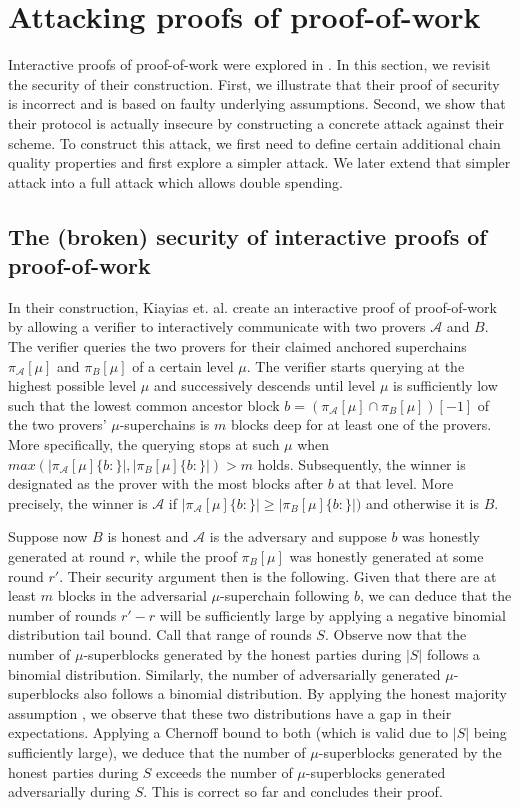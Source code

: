 \section{Attacking proofs of proof-of-work}

Interactive proofs of proof-of-work were explored in \cite{KLS}. In this
section, we revisit the security of their construction. First, we illustrate
that their proof of security is incorrect and is based on faulty underlying
assumptions. Second, we show that their protocol is actually insecure by
constructing a concrete attack against their scheme. To construct this attack,
we first need to define certain additional chain quality properties and first
explore a simpler attack. We later extend that simpler attack into a full attack
which allows double spending.

\subsection{The (broken) security of interactive proofs of proof-of-work}

In their construction, Kiayias et. al. \cite{KLS} create an interactive proof of
proof-of-work by allowing a verifier to interactively communicate with two
provers $\mathcal{A}$ and $B$. The verifier queries the two provers for their
claimed anchored superchains $\pi_\mathcal{A}[\mu]$ and $\pi_B[\mu]$ of a
certain level $\mu$. The verifier starts querying at the highest possible level
$\mu$ and successively descends until level $\mu$ is sufficiently low such that
the lowest common ancestor block $b = (\pi_\mathcal{A}[\mu] \cap
\pi_B[\mu])[-1]$ of the two provers' $\mu$-superchains is $m$ blocks deep for at
least one of the provers. More specifically, the querying stops at such $\mu$
when $max(|\pi_\mathcal{A}[\mu]\{b:\}|, |\pi_B[\mu]\{b:\}|) > m$ holds.
Subsequently, the winner is designated as the prover with the most blocks after
$b$ at that level. More precisely, the winner is $\mathcal{A}$ if
$|\pi_\mathcal{A}[\mu]\{b:\}| \geq |\pi_B[\mu]\{b:\}|)$ and otherwise it is $B$.

Suppose now $B$ is honest and $\mathcal{A}$ is the adversary and suppose $b$ was
honestly generated at round $r$, while the proof $\pi_B[\mu]$ was honestly
generated at some round $r'$. Their security argument then is the following.
Given that there are at least $m$ blocks in the adversarial $\mu$-superchain
following $b$, we can deduce that the number of rounds $r' - r$ will be
sufficiently large by applying a negative binomial distribution tail bound. Call
that range of rounds $S$. Observe now that the number of $\mu$-superblocks
generated by the honest parties during $|S|$ follows a binomial distribution.
Similarly, the number of adversarially generated $\mu$-superblocks also follows
a binomial distribution. By applying the honest majority assumption
\cite{backbone}, we observe that these two distributions have a gap in their
expectations. Applying a Chernoff bound to both (which is valid due to $|S|$
being sufficiently large), we deduce that the number of $\mu$-superblocks
generated by the honest parties during $S$ exceeds the number of
$\mu$-superblocks generated adversarially during $S$. This is correct so far and
concludes their proof.

